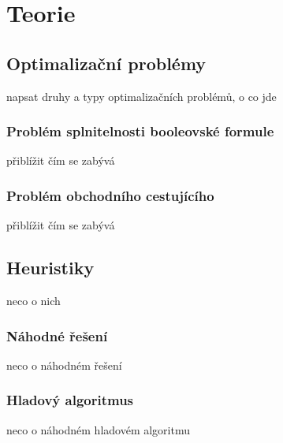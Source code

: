 \chapter{Teorie}

\section{Optimalizační problémy}

napsat druhy a typy optimalizačních problémů, o co jde

\subsection{Problém splnitelnosti booleovské formule}

přiblížit čím se zabývá


\subsection{Problém obchodního cestujícího}

přiblížit čím se zabývá


\section{Heuristiky}
neco o nich 

\subsection{Náhodné řešení}
neco o náhodném řešení

\subsection{Hladový algoritmus}
neco o náhodném hladovém algoritmu

